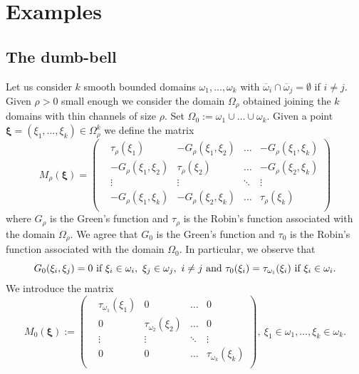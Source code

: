 \documentclass[11pt,a4paper]{amsart}
\theoremstyle{definition}
\renewcommand{\(}{\left(}
\renewcommand{\)}{\right)}
\begin{document}
\section{Examples}\label{sec3}



\subsection{The dumb-bell}
Let us consider $k$  smooth bounded domains $\omega_1,\dots,\omega_k$ with  $\overline{\omega}_i \cap \overline{\omega}_j= \emptyset$ if $i\not=j.$
Given $\rho>0$ small enough we consider the domain $\Omega_\rho$ obtained joining the $k$ domains with thin channels of size $\rho.$  Set $\Omega_0:=\omega_1\cup\dots\cup\omega_k.$
Given a point $\boldsymbol\xi=(\xi_1,\dots,\xi_k)\in \Omega_\rho^k$ we define the matrix
$$M_\rho(\boldsymbol\xi)=\left(\begin{matrix}
&\tau_{\rho}(\xi_1)&-G_\rho(\xi_1,\xi_2)&\dots&-G_\rho(\xi_1,\xi_k)\\
&-G_\rho(\xi_1,\xi_2)&\tau_{\rho}(\xi_2)&\dots&-G_\rho(\xi_2,\xi_k)\\
&\vdots&\vdots&\ddots&\vdots\\
&-G_\rho(\xi_1,\xi_k)&-G_\rho(\xi_2,\xi_k)&\dots&\tau_{\rho}(\xi_k)\\
\end{matrix}\right)$$
where $G_\rho$ is the Green's function and $\tau_\rho$ is the Robin's function associated with  the domain $\Omega_\rho$.  We agree that
$G_0$ is the Green's function and $\tau_0$ is the Robin's function associated with  the domain $\Omega_0$. In particular, we observe that
$$G_0(\xi_i,\xi_j)=0\ \hbox{if}\ \xi_i\in\omega_i,\ \xi_j\in\omega_j,\ i\not=j\ \hbox{and}\ \tau_0(\xi_i)=\tau_{\omega_i}(\xi_i)\  \hbox{if}\ \xi_i\in\omega_i.$$ We introduce the matrix
$$M_0 (\boldsymbol\xi):=\left(\begin{matrix}
&\tau_{\omega_1}(\xi_1)&0&\dots&0\\
&0&\tau_{\omega_2}(\xi_2)&\dots&0\\
&\vdots&\vdots&\ddots&\vdots\\
&0&0&\dots&\tau_{\omega_k}(\xi_k)\\
\end{matrix}\right),\ \xi_1\in\omega_1,\dots,\xi_k\in\omega_k.$$
\end{document}
